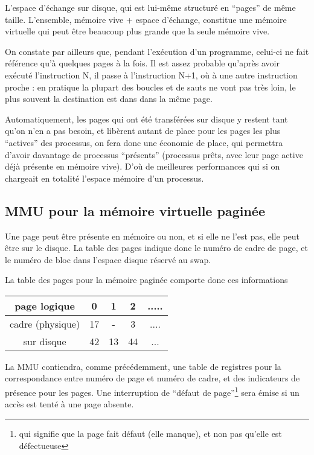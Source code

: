 \begin{multicols}{2}
L'espace d'échange sur disque, qui est lui-même structuré en ``pages''
de même taille.  L'ensemble, mémoire vive + espace d'échange,
constitue une mémoire virtuelle qui peut être beaucoup plus grande que
la seule mémoire vive.



On constate par ailleurs que, pendant l'exécution d'un programme,
celui-ci ne fait référence qu'à quelques pages à la fois. Il est assez
probable qu'après avoir exécuté l'instruction N, il passe à
l'instruction N+1, où à une autre instruction proche : en pratique la
plupart des boucles et de sauts ne vont pas très loin, le plus souvent
la destination est dans dans la même page.

Automatiquement, les pages qui ont été transférées sur disque y
restent tant qu'on n'en a pas besoin, et libèrent autant de place pour
les pages les plus ``actives'' des processus, on fera donc une
économie de place, qui permettra d'avoir davantage de processus
``présents'' (processus prêts, avec leur page active déjà présente en
mémoire vive).  D'où de meilleures performances qui si on chargeait en
totalité l'espace mémoire d'un processus.

\subsection{MMU pour la mémoire virtuelle paginée}

Une page peut être présente en mémoire ou non, et si elle ne l'est
pas, elle peut être sur le disque.  La table des pages indique donc le
numéro de cadre de page, et le numéro de bloc dans l'espace disque
réservé au swap.

La table des pages pour la mémoire paginée comporte donc ces informations

\begin{tabular}{|c|cccc|}
\hline
page logique  & 0 & 1 & 2 &..... \\
\hline
cadre (physique) &  17 & - & 3 & .... \\
sur disque  & 42 & 13 & 44 & ... \\
\hline
\end{tabular}

La MMU contiendra, comme précédemment, une table de registres pour la
correspondance entre numéro de page et numéro de cadre, et des
indicateurs de présence pour les pages.  Une interruption de ``défaut
de page''\footnote{qui signifie que la page fait défaut (elle manque),
  et non pas qu'elle est défectueuse} sera émise si un accès est tenté
à une page absente.


\end{multicols}
